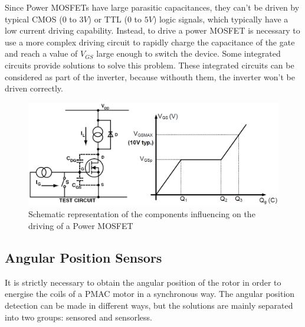 Since Power \ac{MOSFET}s have large parasitic capacitances, they can't be driven by typical CMOS ($0$ to $3V$) or TTL ($0$ to $5V$) logic signals, which typically have a low current driving capability. Instead, to drive a power \ac{MOSFET} is necessary to use a more complex driving circuit to rapidly charge the capacitance of the gate and reach a value of $V_{GS}$ large enough to switch the device. Some integrated circuits provide solutions to solve this problem. These integrated circuits can be considered as part of the inverter, because withouth them, the inverter won't be driven correctly.

\begin{figure}[htbp]
\centering
\includegraphics[width=\textwidth]{Images/mosfet_drive.png} 
\caption[MOSFET Driving Diagram]{Schematic representation of the components influencing on the driving of a Power MOSFET}
\label{fig:mosfet_drive}
\end{figure}

\subsection{Angular Position Sensors} \label{subsection:angular_sensors}

It is strictly necessary to obtain the angular position of the rotor in order to energise the coils of a \ac{PMAC} motor in a synchronous way. The angular position detection can be made in different ways, but the solutions are mainly separated into two groups: sensored and sensorless.

